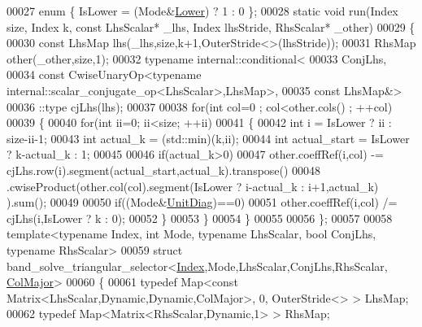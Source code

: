 \begin{DoxyCode}
00027   \textcolor{keyword}{enum} \{ IsLower = (Mode&\hyperlink{group__enums_gga39e3366ff5554d731e7dc8bb642f83cda891792b8ed394f7607ab16dd716f60e6}{Lower}) ? 1 : 0 \};
00028   \textcolor{keyword}{static} \textcolor{keywordtype}{void} run(Index size, Index k, \textcolor{keyword}{const} LhsScalar* \_lhs, Index lhsStride, RhsScalar* \_other)
00029   \{
00030     \textcolor{keyword}{const} LhsMap lhs(\_lhs,size,k+1,OuterStride<>(lhsStride));
00031     RhsMap other(\_other,size,1);
00032     \textcolor{keyword}{typename} internal::conditional<
00033                           ConjLhs,
00034                           \textcolor{keyword}{const} CwiseUnaryOp<typename internal::scalar\_conjugate\_op<LhsScalar>,LhsMap>,
00035                           \textcolor{keyword}{const} LhsMap&>
00036                         ::type cjLhs(lhs);
00037                         
00038     \textcolor{keywordflow}{for}(\textcolor{keywordtype}{int} col=0 ; col<other.cols() ; ++col)
00039     \{
00040       \textcolor{keywordflow}{for}(\textcolor{keywordtype}{int} ii=0; ii<size; ++ii)
00041       \{
00042         \textcolor{keywordtype}{int} i = IsLower ? ii : size-ii-1;
00043         \textcolor{keywordtype}{int} actual\_k = (std::min)(k,ii);
00044         \textcolor{keywordtype}{int} actual\_start = IsLower ? k-actual\_k : 1;
00045         
00046         \textcolor{keywordflow}{if}(actual\_k>0)
00047           other.coeffRef(i,col) -= cjLhs.row(i).segment(actual\_start,actual\_k).transpose()
00048                                   .cwiseProduct(other.col(col).segment(IsLower ? i-actual\_k : i+1,actual\_k)
      ).sum();
00049 
00050         \textcolor{keywordflow}{if}((Mode&\hyperlink{group__enums_gga39e3366ff5554d731e7dc8bb642f83cdaddb72f888ac85d5a1c52333e54f9374b}{UnitDiag})==0)
00051           other.coeffRef(i,col) /= cjLhs(i,IsLower ? k : 0);
00052       \}
00053     \}
00054   \}
00055   
00056 \};
00057 
00058 \textcolor{keyword}{template}<\textcolor{keyword}{typename} Index, \textcolor{keywordtype}{int} Mode, \textcolor{keyword}{typename} LhsScalar, \textcolor{keywordtype}{bool} ConjLhs, \textcolor{keyword}{typename} RhsScalar>
00059 \textcolor{keyword}{struct }band\_solve\_triangular\_selector<\hyperlink{namespace_eigen_a62e77e0933482dafde8fe197d9a2cfde}{Index},Mode,LhsScalar,ConjLhs,RhsScalar,
      \hyperlink{group__enums_ggaacded1a18ae58b0f554751f6cdf9eb13a0cbd4bdd0abcfc0224c5fcb5e4f6669a}{ColMajor}>
00060 \{
00061   \textcolor{keyword}{typedef} Map<const Matrix<LhsScalar,Dynamic,Dynamic,ColMajor>, 0, OuterStride<> > LhsMap;
00062   \textcolor{keyword}{typedef} Map<Matrix<RhsScalar,Dynamic,1> > RhsMap;

\end{DoxyCode}
